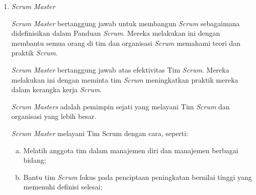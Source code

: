 \begin{enumerate}
\begin{enumerate} [a.]
			\item Mengembangkan dan mengkomunikasikan tujuan produk dengan jelas;

			\item Membuat dan mengkomunikasikan item backlog produk dengan jelas; 
			
			\item Memesan backlog produk; dan,

			\item Pastikan \emph{Product Backlog} transparan, terlihat, dan mudah dipahami.
		
		\end{enumerate}
		
		Pemilik Produk dapat melakukan pekerjaan yang dijelaskan di atas atau mendelegasikan tanggung jawab kepada orang lain. Seluruh organisasi harus menghormati keputusan mereka. Keputusan ini tercermin dalam konten dan urutan \emph{Product Backlog}, dan melalui peningkatan yang dapat diperiksa di \emph{Sprint Review}.

		Pemilik Produk adalah orang, bukan panitia. Pemilik Produk dapat mewakili kebutuhan banyak pemangku kepentingan dalam \emph{Product Backlog}. Siapapun anggota tim yang ingin mengubah \emph{Product Backlog} dapat melakukannya dengan mencoba meyakinkan Pemilik Produk.
		
		\item \emph{Scrum Master}
		
		\emph{Scrum Master} bertanggung jawab untuk membangun \emph{Scrum} sebagaimana didefinisikan dalam Panduan \emph{Scrum}. Mereka melakukan ini dengan membantu semua orang di tim dan organisasi \emph{Scrum} memahami teori dan praktik \emph{Scrum}.

		\emph{Scrum Master} bertanggung jawab atas efektivitas Tim \emph{Scrum}. Mereka melakukan ini dengan meminta tim \emph{Scrum} meningkatkan praktik mereka dalam kerangka kerja \emph{Scrum}.

		\emph{Scrum Masters} adalah pemimpin sejati yang melayani Tim \emph{Scrum} dan organisasi yang lebih besar.

		\emph{Scrum Master} melayani Tim Scrum dengan cara, seperti:
		
		\begin{enumerate}[a.]
		
			\item Melatih anggota tim dalam manajemen diri dan manajemen berbagai bidang;

			\item Bantu tim \emph{Scrum} fokus pada penciptaan peningkatan bernilai tinggi yang memenuhi definisi selesai;


\end{enumerate}
\end{enumerate}
